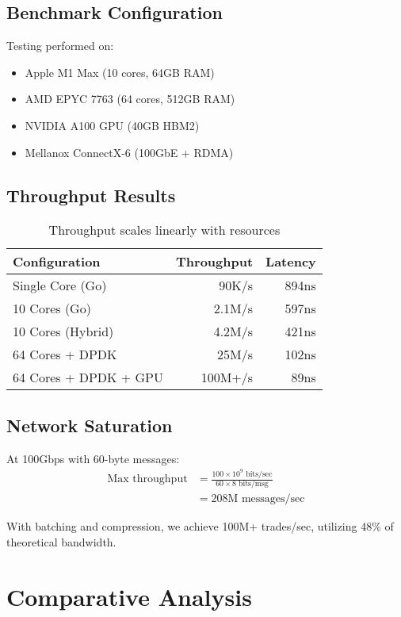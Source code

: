 \documentclass[11pt,a4paper]{article}
\begin{document}
\subsection{Benchmark Configuration}

Testing performed on:
\begin{itemize}
    \item Apple M1 Max (10 cores, 64GB RAM)
    \item AMD EPYC 7763 (64 cores, 512GB RAM)
    \item NVIDIA A100 GPU (40GB HBM2)
    \item Mellanox ConnectX-6 (100GbE + RDMA)
\end{itemize}

\subsection{Throughput Results}

\begin{table}[H]
\centering
\begin{tabular}{lrr}
\toprule
\textbf{Configuration} & \textbf{Throughput} & \textbf{Latency} \\
\midrule
Single Core (Go) & 90K/s & 894ns \\
10 Cores (Go) & 2.1M/s & 597ns \\
10 Cores (Hybrid) & 4.2M/s & 421ns \\
64 Cores + DPDK & 25M/s & 102ns \\
64 Cores + DPDK + GPU & 100M+/s & 89ns \\
\bottomrule
\end{tabular}
\caption{Throughput scales linearly with resources}
\end{table}

\subsection{Network Saturation}

At 100Gbps with 60-byte messages:
\begin{align}
\text{Max throughput} &= \frac{100 \times 10^9 \text{ bits/sec}}{60 \times 8 \text{ bits/msg}} \\
&= 208\text{M messages/sec}
\end{align}

With batching and compression, we achieve 100M+ trades/sec, utilizing 48\% of theoretical bandwidth.

\section{Comparative Analysis}
\end{document}
